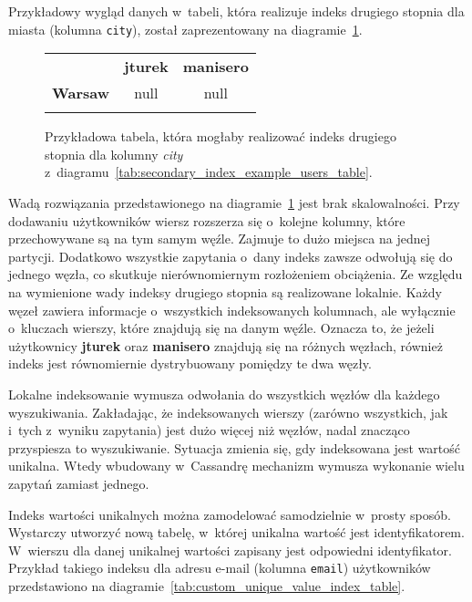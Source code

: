 Przykładowy wygląd danych w~tabeli, która realizuje indeks drugiego stopnia dla miasta (kolumna \verb+city+), został zaprezentowany na diagramie~\ref{tab:secondary_index_example_index_table}.

\begin{figure}[ht!]
	\centering

	\begin{tabular}{|l||c|c|}
		\hhline{|-||--|}
		 & \textbf{jturek} & \textbf{manisero} \\
		\hhline{|~||==|}
		\textbf{Warsaw} & null & null \\
		\hhline{|-||--|}
	\end{tabular} 

	\caption{Przykładowa tabela, która mogłaby realizować indeks drugiego stopnia dla kolumny \emph{city} z~diagramu~\ref{tab:secondary_index_example_users_table}.}
	\label{tab:secondary_index_example_index_table}
\end{figure}

Wadą rozwiązania przedstawionego na diagramie~\ref{tab:secondary_index_example_index_table} jest brak skalowalności. Przy dodawaniu użytkowników wiersz rozszerza się o~kolejne kolumny, które przechowywane są na tym samym węźle. Zajmuje to dużo miejsca na jednej partycji. Dodatkowo wszystkie zapytania o~dany indeks zawsze odwołują się do jednego węzła, co skutkuje nierównomiernym rozłożeniem obciążenia. Ze względu na wymienione wady indeksy drugiego stopnia są realizowane lokalnie. Każdy węzeł zawiera informacje o~wszystkich indeksowanych kolumnach, ale wyłącznie o~kluczach wierszy, które znajdują się na danym węźle. Oznacza to, że jeżeli użytkownicy \textbf{jturek} oraz \textbf{manisero} znajdują się na różnych węzłach, również indeks jest równomiernie dystrybuowany pomiędzy te dwa węzły.

Lokalne indeksowanie wymusza odwołania do wszystkich węzłów dla każdego wyszukiwania. Zakładając, że indeksowanych wierszy (zarówno wszystkich, jak i~tych z~wyniku zapytania) jest dużo więcej niż węzłów, nadal znacząco przyspiesza to wyszukiwanie. Sytuacja zmienia się, gdy indeksowana jest wartość unikalna. Wtedy wbudowany w~Cassandrę mechanizm wymusza wykonanie wielu zapytań zamiast jednego. 

Indeks wartości unikalnych można zamodelować samodzielnie w~prosty sposób.~\cite{unique_column_index} Wystarczy utworzyć nową tabelę, w~której unikalna wartość jest identyfikatorem. W~wierszu dla danej unikalnej wartości zapisany jest odpowiedni identyfikator. Przykład takiego indeksu dla adresu e-mail (kolumna \verb+email+) użytkowników przedstawiono na diagramie~\ref{tab:custom_unique_value_index_table}.

